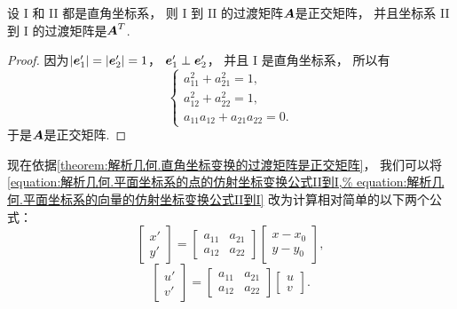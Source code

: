 \begin{theorem}\label{theorem:解析几何.直角坐标变换的过渡矩阵是正交矩阵}
设 I 和 II 都是直角坐标系，
则 I 到 II 的过渡矩阵\(\boldsymbol{A}\)是正交矩阵，
并且坐标系 II 到 I 的过渡矩阵是\(\boldsymbol{A}^T\).
\begin{proof}
因为\(\abs{\boldsymbol{e}_1'}=\abs{\boldsymbol{e}_2'}=1\)，
\(\boldsymbol{e}_1' \perp \boldsymbol{e}_2'\)，
并且 I 是直角坐标系，
所以有\begin{equation}\label{equation:解析几何.直角坐标变换的过渡矩阵的限定条件}
	\left\{ \begin{array}{l}
		a_{11}^2 + a_{21}^2 = 1, \\
		a_{12}^2 + a_{22}^2 = 1, \\
		a_{11} a_{12} + a_{21} a_{22} = 0.
	\end{array} \right.
\end{equation}
于是\(\boldsymbol{A}\)是正交矩阵.
\end{proof}
\end{theorem}

现在依据\cref{theorem:解析几何.直角坐标变换的过渡矩阵是正交矩阵}，
我们可以将\cref{equation:解析几何.平面坐标系的点的仿射坐标变换公式II到I,%
equation:解析几何.平面坐标系的向量的仿射坐标变换公式II到I} 改为计算相对简单的以下两个公式：
\begin{equation}\label{equation:解析几何.平面坐标系的点的直角坐标变换公式II到I.矩阵形式1}
	\begin{bmatrix}
		x' \\ y'
	\end{bmatrix}
	= \begin{bmatrix}
		a_{11} & a_{21} \\
		a_{12} & a_{22}
	\end{bmatrix} \begin{bmatrix}
		x - x_0 \\ y - y_0
	\end{bmatrix},
\end{equation}
\begin{equation}\label{equation:解析几何.平面坐标系的向量的直角坐标变换公式II到I.矩阵形式1}
	\begin{bmatrix}
		u' \\ v'
	\end{bmatrix}
	= \begin{bmatrix}
		a_{11} & a_{21} \\
		a_{12} & a_{22}
	\end{bmatrix} \begin{bmatrix}
		u \\ v
	\end{bmatrix}.
\end{equation}

